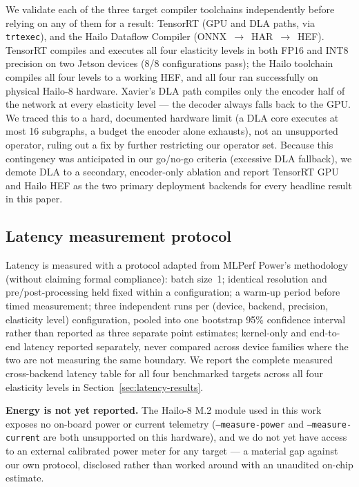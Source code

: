\documentclass[a4paper,review,12pt]{elsarticle}
\begin{document}
We validate each of the three target compiler toolchains independently before
relying on any of them for a result: TensorRT (GPU and DLA paths, via
\texttt{trtexec}), and the Hailo Dataflow Compiler (ONNX~$\to$~HAR~$\to$~HEF).
TensorRT compiles and executes all four elasticity levels in both FP16 and
INT8 precision on two Jetson devices (8/8 configurations pass); the Hailo
toolchain compiles all four levels to a working HEF, and all four ran
successfully on physical Hailo-8 hardware. Xavier's DLA path compiles only the
encoder half of the network at every elasticity level --- the decoder always
falls back to the GPU. We traced this to a hard, documented hardware limit (a
DLA core executes at most 16 subgraphs, a budget the encoder alone exhausts),
not an unsupported operator, ruling out a fix by further restricting our
operator set. Because this contingency was anticipated in our go/no-go
criteria (excessive DLA fallback), we demote DLA to a secondary,
encoder-only ablation and report TensorRT GPU and Hailo HEF as the two primary
deployment backends for every headline result in this paper.

\subsection{Latency measurement protocol}
\label{sec:latency-protocol}

Latency is measured with a protocol adapted from MLPerf Power's methodology
(without claiming formal compliance): batch size~1; identical resolution and
pre/post-processing held fixed within a configuration; a warm-up period before
timed measurement; three independent runs per (device, backend, precision,
elasticity level) configuration, pooled into one bootstrap 95\% confidence
interval rather than reported as three separate point estimates; kernel-only
and end-to-end latency reported separately, never compared across device
families where the two are not measuring the same boundary. We report the
complete measured cross-backend latency table for all four benchmarked
targets across all four elasticity levels in Section~\ref{sec:latency-results}.

\textbf{Energy is not yet reported.} The Hailo-8 M.2 module used in this work
exposes no on-board power or current telemetry (\texttt{--measure-power} and
\texttt{--measure-current} are both unsupported on this hardware), and we do
not yet have access to an external calibrated power meter for any target ---
a material gap against our own protocol, disclosed rather than worked around
with an unaudited on-chip estimate.
\end{document}
